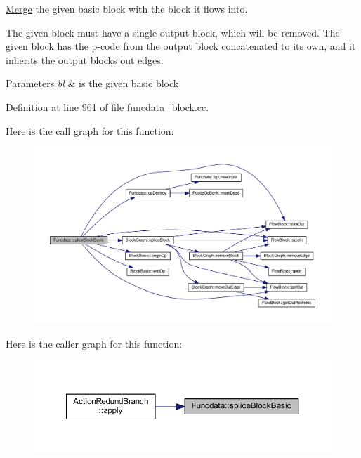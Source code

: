 \mbox{\hyperlink{class_merge}{Merge}} the given basic block with the block it flows into. 

The given block must have a single output block, which will be removed. The given block has the p-\/code from the output block concatenated to its own, and it inherits the output block\textquotesingle{}s out edges. 
\begin{DoxyParams}{Parameters}
{\em bl} & is the given basic block \\
\hline
\end{DoxyParams}


Definition at line 961 of file funcdata\+\_\+block.\+cc.

Here is the call graph for this function\+:
\nopagebreak
\begin{figure}[H]
\begin{center}
\leavevmode
\includegraphics[width=350pt]{class_funcdata_a9f0c9d7c7fb4217731ae45f7848e4034_cgraph}
\end{center}
\end{figure}
Here is the caller graph for this function\+:
\nopagebreak
\begin{figure}[H]
\begin{center}
\leavevmode
\includegraphics[width=350pt]{class_funcdata_a9f0c9d7c7fb4217731ae45f7848e4034_icgraph}
\end{center}
\end{figure}
\mbox{\label{class_funcdata_a5acffbbc08461b91111ef9c943a9222f}} 
